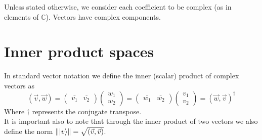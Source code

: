 
	
	
	Unless stated otherwise, we consider each coefficient to be complex (as in elements of $\mathbb{C}$). Vectors have complex components.
	\section{Inner product spaces}
	In standard vector notation we define the inner (scalar) product of complex vectors as
	\begin{equation*}
	 ( \vec{v}, \vec{w} ) =  \begin{pmatrix} \bar{v_1} & \bar{v_2}\end{pmatrix} \begin{pmatrix} w_1 \\ w_2 \end{pmatrix} = \begin{pmatrix} \bar{w_1} & \bar{w_2}\end{pmatrix} \begin{pmatrix} v_1 \\ v_2 \end{pmatrix} = ( \vec{w}, \vec{v} )^{\dagger}
	\end{equation*}
	Where $\dagger$ represents the conjugate transpose.\\
	
	It is important also to note that through the inner product of two vectors we also define the norm $\||v \rangle\|  =  \sqrt{( \vec{v}, \vec{v} )} $.\\
	
